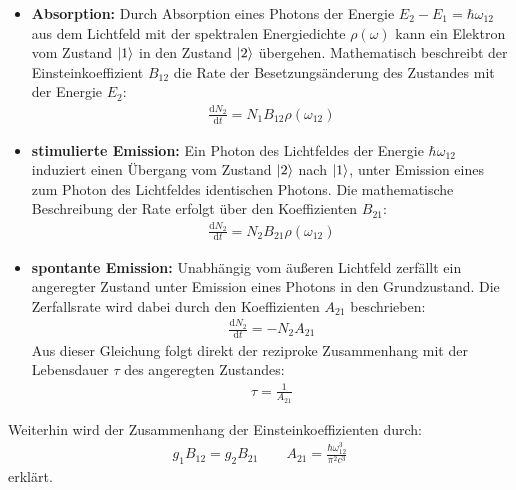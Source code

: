 \documentclass[11pt, a4paper]{article}
\numberwithin{equation}{section}
\begin{document}
\begin{itemize}
	\item \textbf{Absorption:} Durch Absorption eines Photons der Energie $E_2 - E_1 = \hbar \omega_{12}$ aus dem Lichtfeld mit der spektralen Energiedichte $\rho(\omega)$ kann ein Elektron vom Zustand $\ket{1}$ in den Zustand $\ket{2}$ übergehen.
	Mathematisch beschreibt der Einsteinkoeffizient $B_{12}$ die Rate der Besetzungsänderung des Zustandes mit der Energie $E_2$:
	\begin{align}
		\frac{\mathrm{d} N_2}{\mathrm{d} t} = N_1 B_{12} \rho\left( \omega_{12} \right)
	\end{align}
	
	\item \textbf{stimulierte Emission:} Ein Photon des Lichtfeldes der Energie $\hbar \omega_{12}$ induziert einen Übergang vom Zustand $\ket{2}$ nach $\ket{1}$, unter Emission eines zum Photon des Lichtfeldes identischen Photons.
	Die mathematische Beschreibung der Rate erfolgt über den Koeffizienten $B_{21}$:
	\begin{align}
		\frac{\mathrm{d} N_2}{\mathrm{d} t} = N_2 B_{21} \rho\left( \omega_{12} \right)
	\end{align}
	
	\item \textbf{spontante Emission:}
	Unabhängig vom äußeren Lichtfeld zerfällt ein angeregter Zustand unter Emission eines Photons in den Grundzustand.
	Die Zerfallsrate wird dabei durch den Koeffizienten $A_{21}$ beschrieben:
	\begin{align}
		\frac{\mathrm{d} N_2}{\mathrm{d} t} = - N_2 A_{21}
	\end{align}
	Aus dieser Gleichung folgt direkt der reziproke Zusammenhang mit der Lebensdauer $\tau$ des angeregten Zustandes:
	\begin{align}
		\tau = \frac{1}{A_{21}}
	\end{align}
\end{itemize}
Weiterhin wird der Zusammenhang der Einsteinkoeffizienten durch:
\begin{align}
	g_1 B_{12} = g_2 B_{21}  \qquad A_{21} = \frac{\hbar \omega_{12}^3}{\pi^2 c^3}
\end{align}
erklärt.
\end{document}
